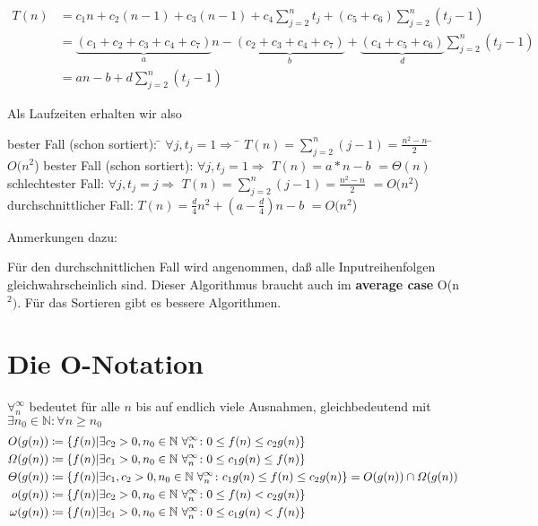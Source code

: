 \documentclass[ngerman,draft,parskip=half*,twoside]{scrreprt}
\theoremstyle{break}
\begin{document}
\begin{align*}
  T(n) &= c_1 n + c_2(n-1) + c_3(n-1) + c_4\sum_{j=2}^{n}t_j
     + (c_5+c_6)\sum_{j=2}^{n}(t_j-1)\\
  &=\underbrace{(c_1+c_2+c_3+c_4+c_7)}_{a}n -
     \underbrace{(c_2+c_3+c_4+c_7)}_{b} +
     \underbrace{(c_4+c_5+c_6)}_{d}\sum_{j=2}^{n}(t_j-1)\\
  &=  a n-b+d\sum_{j=2}^{n}(t_j-1)
\end{align*}

Als Laufzeiten erhalten wir also
\begin{tabbing}
bester Fall (schon sortiert): \= $ \forall j,t_j=1 \Rightarrow$ \= $T(n)=\sum_{j=2}^{n}(j-1)= \frac {n^2-n}{2}$ \= $O(n^2$) \kill
bester Fall (schon sortiert): \> $ \forall j,t_j=1 \Rightarrow$ \> $T(n)=a*n-b$ \> $=\Theta(n)$ \\ 
schlechtester Fall: \> $ \forall j,t_j=j \Rightarrow$ \> $T(n)=\sum_{j=2}^{n}(j-1)= \frac {n^2-n}{2}$ \> $=O(n^2$)\\
durchschnittlicher Fall: \> \> $T(n)=\frac{d}{4}n^2+(a-\frac{d}{4})n-b$ \> $=O(n^2$)
\end{tabbing}

\noindent Anmerkungen dazu:

Für den durchschnittlichen Fall wird angenommen, daß alle
Inputreihenfolgen gleichwahrscheinlich sind.
Dieser Algorithmus braucht auch im \textbf{average case} O(n$^2)$. Für das Sortieren gibt es
bessere Algorithmen.

\section{Die O-Notation}
$\forall_n^\infty$ bedeutet für alle $n$ bis auf endlich viele
Ausnahmen, gleichbedeutend mit $\exists n_0 \in \mathbb{N}\colon  \forall n\geq n_0$
\begin{align*}
  O(g(n)) &\coloneqq \{ f(n) | \exists c_2 > 0, n_0 \in \mathbb{N}\
  \forall_n^\infty\colon  0\leq f(n)\leq c_2 g(n)\}\\
  \Omega(g(n)) &\coloneqq \{ f(n) | \exists{}c_1 > 0, n_0
  \in\mathbb{N}\ \forall_n^\infty\colon  0\leq c_1 g(n)\leq f(n) 
    \} \\
  \Theta(g(n)) &\coloneqq \{ f(n) | \exists c_1, c_2 > 0, n_0 \in \mathbb{N}\ \forall_n^\infty\colon  c_1 g(n)\leq f(n)\leq c_2 g(n)\} =
    \hfill O(g(n)) \cap \Omega(g(n))\\
o(g(n)) &\coloneqq \{ f(n) | \exists c_2 > 0, n_0 \in \mathbb{N}\ \forall_n^\infty\colon  0\leq f(n)< c_2 g(n)\}\\
\omega(g(n)) &\coloneqq \{ f(n) | \exists{}c_1 > 0, n_0 \in  \mathbb{N}\ \forall_n^\infty\colon  0\leq c_1 g(n)< f(n) 
    \}
\end{align*} 
\end{document}
